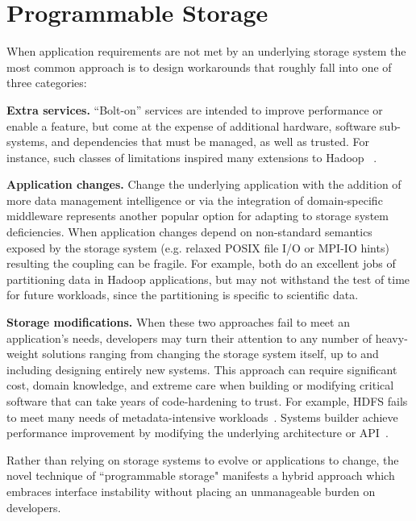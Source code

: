 \section{Programmable Storage}
\label{sec:progly}

When application requirements are not met by an underlying storage system the
most common approach is to design workarounds that roughly fall into one
of three categories:

{\bf Extra services.} ``Bolt-on'' services are intended to improve performance
or enable a feature, but come at the expense of additional hardware, software
sub-systems, and dependencies that must be managed, as well as trusted.
For instance, such classes of limitations inspired many extensions to Hadoop
~\cite{bu:vldb2010-haloop, ekanayake:hpdc2010-twister,
ekanayake:escience2008-eglmapreduce, mihailescu:hotstorage2012-mixapart}.

{\bf Application changes.} Change the underlying application with the addition of
 more data management intelligence or via the integration of domain-specific middleware
 represents another popular option for adapting to storage system deficiencies. 
 When application changes depend on non-standard semantics exposed by the storage
system (e.g. relaxed POSIX file I/O or MPI-IO hints) resulting the coupling 
can be fragile.
For example, both \cite{buck:hpc2011-scihadoop, gkantsidis:nsdi2013-rhea} do
an excellent jobs of partitioning data in Hadoop applications, but may not
withstand the test of time for future workloads, since the partitioning is
specific to scientific data.

{\bf Storage modifications.} When these two approaches fail to meet an
application's needs, developers may turn their attention to any number of
heavy-weight solutions ranging from changing the storage system itself, up to
and including designing entirely new systems. This approach can require
significant cost, domain knowledge, and extreme care when building or
modifying critical software that can take years of code-hardening to trust.
For example, HDFS fails to meet many needs 
of metadata-intensive workloads~\cite{shvachko:login2012-hdfs-scalability}.
Systems builder achieve performance improvement by modifying the underlying
architecture or API~\cite{balmin:sigmod2012-clydesdale}.

Rather than relying on storage systems to evolve or applications to
change, the novel technique of ``programmable storage"
manifests a hybrid approach which embraces interface instability without placing
an unmanageable burden on developers.

